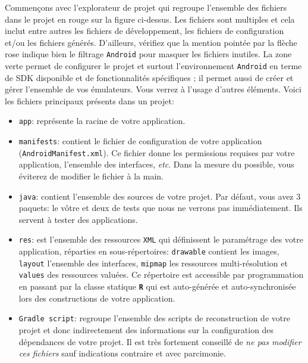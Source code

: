 \documentclass[a4paper,10pt]{article}
\begin{document}
\begin{center}
\end{center}

Commençons avec l'explorateur de projet qui regroupe l'ensemble des fichiers dans le projet en rouge sur la figure ci-dessus. Les fichiers sont multiples et cela inclut entre autres les fichiers de développement, les fichiers de configuration et/ou les fichiers générés. D'ailleurs, vérifiez que la mention pointée par la flèche rose indique bien le filtrage \texttt{Android} pour masquer les fichiers inutiles. La zone verte permet de configurer le projet et surtout l'environnement \texttt{Android} en terme de SDK disponible et de fonctionnalités spécifiques ; il permet aussi de créer et gérer l'ensemble de vos émulateurs. Vous verrez à l'usage d'autres éléments. Voici les fichiers principaux présents dans un projet:

\begin{itemize}
	\item \texttt{app}: représente la racine de votre application.
	\item \texttt{manifests}: contient le fichier de configuration de votre application (\texttt{AndroidManifest.xml}). Ce fichier donne les permissions requises par votre application, l'ensemble des interfaces, \textit{etc}. Dans la mesure du possible, vous éviterez de modifier le fichier à la main.
	\item \texttt{java}: contient l'ensemble des sources de votre projet. Par défaut, vous avez 3 paquets: le vôtre et deux de tests que nous ne verrons pas immédiatement. Ils servent à tester des applications.
	\item \texttt{res}: est l'ensemble des ressources \texttt{XML} qui définissent le paramétrage des votre application, réparties en sous-répertoires: \texttt{drawable} contient les images, \texttt{layout} l'ensemble des interfaces, \texttt{mipmap} les ressources multi-résolution et \texttt{values} des ressources valuées. Ce répertoire est accessible par programmation en passant par la classe statique \textbf{\texttt{R}} qui est auto-générée et auto-synchronisée lors des constructions de votre application.
	\item \texttt{Gradle script}: regroupe l'ensemble des scripts de reconstruction de votre projet et donc indirectement des informations sur la configuration des dépendances de votre projet. Il est très fortement conseillé de \textit{ne pas modifier ces fichiers} sauf indications contraire et avec parcimonie. 
\end{itemize}
\end{document}
